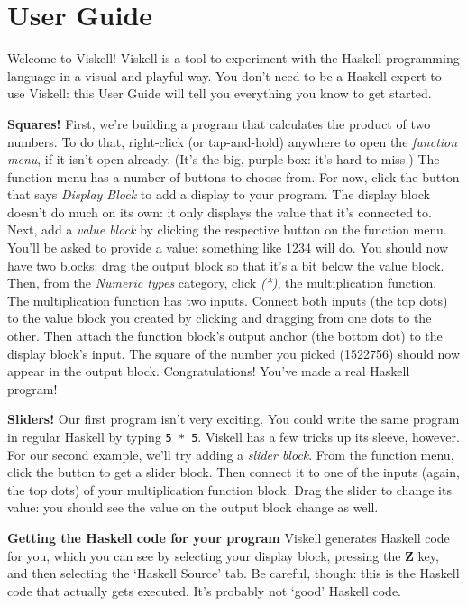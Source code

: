 \chapter{User Guide}
\label{chap:Guide}

Welcome to Viskell!
Viskell is a tool to experiment with the Haskell programming language in a visual and playful way.
You don't need to be a Haskell expert to use Viskell: this User Guide will tell you everything you know to get started.

\textbf{Squares!}
First, we're building a program that calculates the product of two numbers.
To do that, right-click (or tap-and-hold) anywhere to open the \emph{function menu}, if it isn't open already.
(It's the big, purple box: it's hard to miss.)
The function menu has a number of buttons to choose from.
For now, click the button that says \emph{Display Block} to add a display to your program.
The display block doesn't do much on its own: it only displays the value that it's connected to.
Next, add a \emph{value block} by clicking the respective button on the function menu.
You'll be asked to provide a value: something like 1234 will do.
You should now have two blocks: drag the output block so that it's a bit below the value block.
Then, from the \emph{Numeric types} category, click \emph{(*)}, the multiplication function.
The multiplication function has two inputs.
Connect both inputs (the top dots) to the value block you created by clicking and dragging from one dots to the other.
Then attach the function block's output anchor (the bottom dot) to the display block's input.
The square of the number you picked (1522756) should now appear in the output block.
Congratulations!
You've made a real Haskell program!

\textbf{Sliders!}
Our first program isn't very exciting.
You could write the same program in regular Haskell by typing \texttt{5 * 5}.
Viskell has a few tricks up its sleeve, however.
For our second example, we'll try adding a \emph{slider block}.
From the function menu, click the button to get a slider block.
Then connect it to one of the inputs (again, the top dots) of your multiplication function block.
Drag the slider to change its value: you should see the value on the output block change as well.

\textbf{Getting the Haskell code for your program}
Viskell generates Haskell code for you, which you can see by selecting your display block, pressing the \textbf{Z} key, and then selecting the `Haskell Source' tab.
Be careful, though: this is the Haskell code that actually gets executed.
It's probably not `good' Haskell code.
